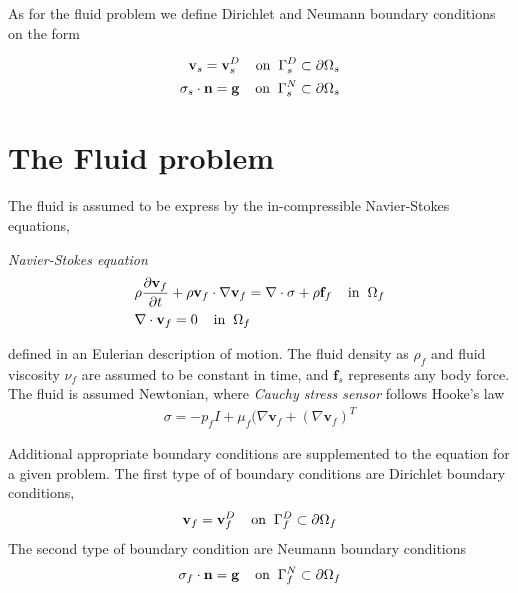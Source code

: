 As for the fluid problem we define Dirichlet and Neumann boundary conditions on the form

\begin{align*}
\mathbf{v}_s = \mathbf{v}_s^D 
\hspace{4mm} \text{on} \hspace{2mm} \Gamma_s^D \subset \partial \Omega_s  \\
\sigma_s \cdot \mathbf{n} = \mathbf{g}  
\hspace{4mm} \text{on} \hspace{2mm} \Gamma_s^N \subset \partial \Omega_s 
\end{align*}


\section{The Fluid problem}
The fluid is assumed to be express by the in-compressible Navier-Stokes equations,
\begin{equat}
\textit{Navier-Stokes equation}
\begin{align}
&\rho \frac{\partial \mathbf{v}_f}{\partial t} + \rho \mathbf{v}_f \cdot \nabla \mathbf{v}_f =
\nabla \cdot \sigma + \rho \mathbf{f}_f \hspace{4mm} \text{in} \hspace{2mm} \Omega_f \\
&\nabla \cdot \mathbf{v}_f = 0 \hspace{4mm} \text{in} \hspace{2mm} \Omega_f 
\end{align} 
\end{equat}
defined in an Eulerian description of motion. The fluid density as $\rho_f$ and fluid viscosity $\nu_f$  are assumed to be constant in time, and $\mathbf{f}_s$ represents any body force. 
The fluid is assumed Newtonian, where \textit{Cauchy stress sensor} follows Hooke's law
\begin{align*}
\sigma = -p_f I + \mu_f (\nabla \mathbf{v}_f + (\nabla \mathbf{v}_f)^T
\end{align*}

Additional appropriate boundary conditions are supplemented to the equation for a given problem. The first type of of boundary conditions are Dirichlet boundary conditions, 
\begin{align}
\mathbf{v}_f = \mathbf{v}_f^D 
\hspace{4mm} \text{on} \hspace{2mm} \Gamma_f^D \subset \partial \Omega_f 
\end{align}
The second type of boundary condition are Neumann boundary conditions
\begin{align}
\sigma_f \cdot \mathbf{n} = \mathbf{g} 
\hspace{4mm} \text{on} \hspace{2mm} \Gamma_f^N \subset \partial \Omega_f 
\end{align}

